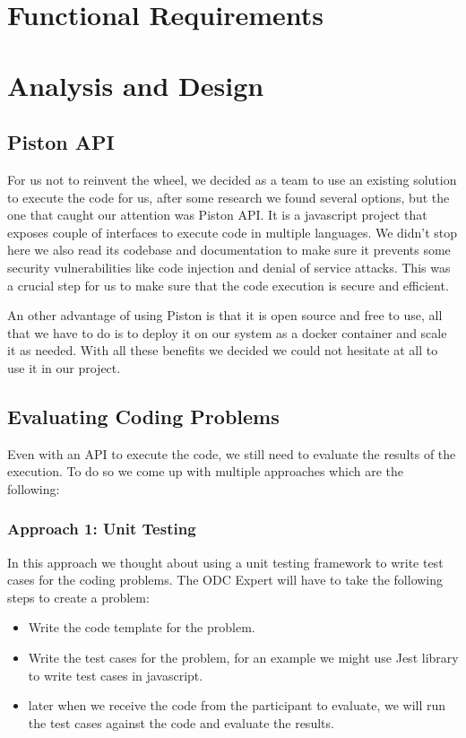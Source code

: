 \section{Functional Requirements}

\section{Analysis and Design}
\subsection{Piston API}
For us not to reinvent the wheel, we decided as a team to use an existing solution to execute the code for us,
after some research we found several options, but the one that caught our attention was Piston API. It is a javascript
project that exposes couple of interfaces to execute code in multiple languages. We didn't stop here we also read
its codebase and documentation to make sure it prevents some security vulnerabilities like code injection and
denial of service attacks. This was a crucial step for us to make sure that the code execution is secure and efficient.

An other advantage of using Piston is that it is open source and free to use, all that we have to do is to deploy
it on our system as a docker container and scale it as needed. With all these benefits we decided we could not hesitate
at all to use it in our project.

\subsection{Evaluating Coding Problems}
Even with an API to execute the code, we still need to evaluate the results of the execution. To do so
we come up with multiple approaches which are the following:

\subsubsection{Approach 1: Unit Testing}
In this approach we thought about using a unit testing framework to write test cases for the coding problems.
The ODC Expert will have to take the following steps to create a problem:
\begin{itemize}
  \item Write the code template for the problem.
  \item Write the test cases for the problem, for an example we might use Jest library to write test cases in javascript.
  \item later when we receive the code from the participant to evaluate, we will run the test cases against the code and evaluate the results.
\end{itemize}

